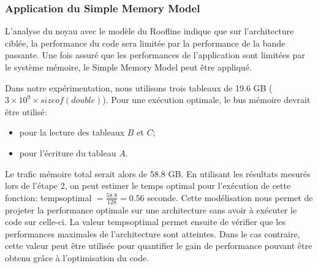 \subsubsection{Application du Simple Memory Model} 
    L'analyse du noyau avec le modèle du Roofline indique que sur l'architecture ciblée, la performance du code sera limitée par la performance de la bande passante.
    Une fois assuré que les performances de l'application sont limitées par le système mémoire, le Simple Memory Model peut être appliqué. 
    
    Dans notre expérimentation, nous utilisons trois tableaux de 19.6 GB ($3 \times 10^9 \times sizeof(double)$). Pour une exécution optimale, le bus mémoire devrait être utilisé:
    \begin{itemize}
        \item pour la lecture des tableaux $B$ et $C$;
        \item pour l'écriture du tableau $A$.
    \end{itemize}
    Le trafic mémoire total serait alors de 58.8 GB. En utilisant les résultats mesurés lors de l'étape 2, on peut estimer le temps optimal pour l'exécution de cette fonction: \gls{tempsoptimal} $= \frac{58.8}{128} = 0.56$ seconde. 
    Cette modélisation nous permet de projeter la performance optimale sur une architecture sans avoir à exécuter le code sur celle-ci. La valeur \gls{tempsoptimal} permet ensuite de vérifier que les performances maximales de l'architecture sont atteintes. Dans le cas contraire, cette valeur peut être utilisée pour quantifier le gain de performance pouvant être obtenu grâce à l'optimisation du code.